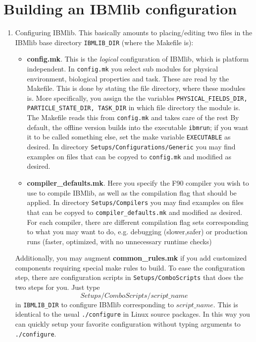 \section{Building an IBMlib configuration}   \label{build:IBMlib}

\begin{enumerate}
  \item Configuring IBMlib.  This basically amounts to placing/editing
        two files in the IBMlib base directory {\tt IBMLIB\_DIR}
        (where the Makefile is):
        \begin{itemize}
           \item {\bf config.mk}. This is the {\it logical} configuration
                 of IBMlib, which is platform independent. In {\tt config.mk}
                 you select sub modules for physical environment, biological
                 properties and task. These are read by the Makefile. This is done by 
                 stating the file directory, where these modules is. More specifically,
                 you assign the the variables 
                 {\tt PHYSICAL\_FIELDS\_DIR,  PARTICLE\_STATE\_DIR,  TASK\_DIR}
                 in which file directory the module is. The Makefile reads this
                 from {\tt config.mk} and takes care of the rest
                 By default, the offline version builds into the executable {\tt  ibmrun}; 
                 if you want it to be called something else, set the make variable 
                 {\tt EXECUTABLE} as desired. 
                 In directory {\tt Setups/Configurations/Generic} you may find examples
                 on files that can be copyed to {\tt config.mk} and modified as desired.
           \item {\bf compiler\_defaults.mk}. Here you specify the F90 compiler you wish to
                 use to compile IBMlib, as well as the compilation flag that should be applied.
                 In directory {\tt Setups/Compilers} you may find examples
                 on files that can be copyed to {\tt compiler\_defaults.mk} and modified 
                 as desired. For each compiler, there are different compilation flag sets
                 corresponding to what you may want to do, e.g. debugging (slower,safer) 
                 or production runs (faster, optimized, with no unnecessary runtime checks)
        \end{itemize}
        Additionally, you may augment {\bf common\_rules.mk} if you add customized
        components requiring special make rules to build. To ease the configuration 
        step, there are configuration scripts in {\tt Setups/ComboScripts} that does the 
        two steps for you. Just type
        \[ Setups/ComboScripts/script\_name
        \]
        in  {\tt IBMLIB\_DIR} to configure IBMlib corresponding to $script\_name$.
        This is identical to the usual {\tt ./configure} in Linux source packages.
        In this way you can quickly setup your favorite configuration without typing 
        arguments to {\tt ./configure}.
           

\end{enumerate}
